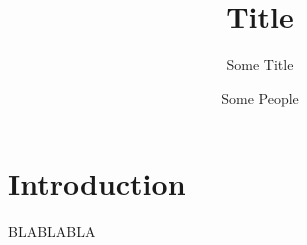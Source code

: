 \documentclass{awesome} %
\begin{document}

\title{Title}
\subtitle{Some Title}
\author{Some People}


\makefrontpage



\tableofcontents

\chapter{Introduction}
BLABLABLA

\nocite{*}
\printbibliography
\end{document}
